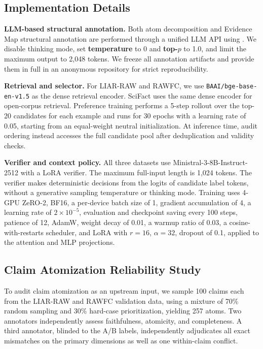 \documentclass[letterpaper]{article}
\begin{document}
\subsection{Implementation Details}

\textbf{LLM-based structural annotation.} Both atom decomposition and Evidence Map structural annotation are performed through a unified LLM API using \texttt{} \citep{DeepSeekAI2026V4}. We disable thinking mode, set \textbf{temperature} to 0 and \textbf{top-$p$} to 1.0, and limit the maximum output to 2,048 tokens. We freeze all annotation artifacts and provide them in full in an anonymous repository for strict reproducibility.

\textbf{Retrieval and selector.} For LIAR-RAW and RAWFC, we use \texttt{BAAI/bge-base-en-v1.5} \citep{Xiao2023BGE} as the dense retrieval encoder. SciFact uses the same dense encoder for open-corpus retrieval. Preference training performs a 5-step rollout over the top-20 candidates for each example and runs for 30 epochs with a learning rate of 0.05, starting from an equal-weight neutral initialization. At inference time, audit ordering instead accesses the full candidate pool after deduplication and validity checks.

\textbf{Verifier and context policy.} All three datasets use Ministral-3-8B-Instruct-2512 \citep{MistralAI2025Ministral3} with a LoRA verifier. The maximum full-input length is 1,024 tokens. The verifier makes deterministic decisions from the logits of candidate label tokens, without a generative sampling temperature or thinking mode. Training uses 4-GPU ZeRO-2, BF16, a per-device batch size of 1, gradient accumulation of 4, a learning rate of $2\times10^{-5}$, evaluation and checkpoint saving every 100 steps, patience of 12, AdamW, weight decay of 0.01, a warmup ratio of 0.03, a cosine-with-restarts scheduler, and LoRA with $r=16$, $\alpha=32$, dropout of 0.1, applied to the attention and MLP projections.

\subsection{Claim Atomization Reliability Study}

To audit claim atomization as an upstream input, we sample 100 claims each from the LIAR-RAW and RAWFC validation data, using a mixture of 70\% random sampling and 30\% hard-case prioritization, yielding 257 atoms. Two annotators independently assess faithfulness, atomicity, and completeness. A third annotator, blinded to the A/B labels, independently adjudicates all exact mismatches on the primary dimensions as well as one within-claim conflict.
\end{document}

